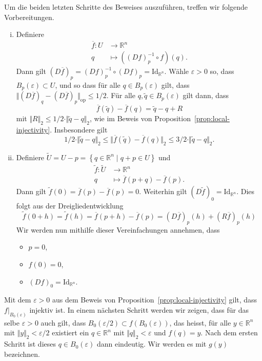 \documentclass[../main.tex]{subfiles}
\begin{document}
Um die beiden letzten Schritte des Beweises auszuführen,
treffen wir folgende Vorbereitungen.
\begin{enumerate}[(i)]
  \item Definiere
    \begin{align*}
      \overline f \colon U & \to \mathbb{R}^n \\
      q & \mapsto ({(Df)}_p^{-1} \circ f)(q).
    \end{align*}
    Dann gilt ${(D \overline f)}_p = {(Df)}_p^{-1} \circ {(Df)}_p 
    = \text{Id}_{\mathbb{R}^n}$.
    Wähle $\varepsilon > 0$ so, dass $B_p(\varepsilon) \subset U$,
    und so dass für alle $q \in B_p(\varepsilon)$ gilt, dass
    \(
      \Vert {(D \overline f)}_q - {(D \overline f)}_p \Vert_{\text{op}}
        \leq 1/2
    \).
    Für alle $q, \widetilde q \in B_p(\varepsilon)$ gilt dann, dass
    \[
      \overline f ( \widetilde q ) - \overline f (q) = \widetilde q - q + R
    \]
    mit $\Vert R \Vert_2 \leq 1/2 \cdot \Vert \widetilde q - q \Vert_2$,
    wie im Beweis von Proposition~\ref{prop:local-injectivity}.
    Insbesondere gilt
    \[
      1/2 \cdot \Vert \widetilde q - q \Vert_2 \leq
      \Vert \overline f ( \widetilde q ) - \overline f (q) \Vert_2
      \leq 3/2 \cdot \Vert \widetilde q - q \Vert_2.
    \]
  \item Definiere $\widetilde U = U - p
    = \left\{q \in \mathbb{R}^n \mid q + p \in U\right\}$
    und 
    \begin{align*}
      \widetilde f \colon \widetilde U & \to \mathbb{R}^n \\
      q & \mapsto \overline f(p + q) - \overline f(p).
    \end{align*}
    Dann gilt $\widetilde f ( 0 ) = \overline f(p) - \overline f (p) = 0$.
    Weiterhin gilt ${(D\widetilde f )}_0 = \text{Id}_{\mathbb{R}^n}$.
    Dies folgt aus der Dreigliedentwicklung
    \[
      \widetilde f ( 0 + h ) = \widetilde f (h)
      = \overline f ( p + h ) - \overline f ( p )
      = {(D \overline f )}_p(h) + {(R \overline f)}_p (h)
    \]
    Wir werden nun mithilfe dieser Vereinfachungen annehmen,
    dass
    \begin{itemize}
      \item $p = 0$,
      \item $f(0) = 0$,
      \item ${(Df)}_0 = \text{Id}_{\mathbb{R}^n}$.
    \end{itemize}
\end{enumerate}

Mit dem $\varepsilon > 0$ aus dem Beweis von
Proposition~\ref{prop:local-injectivity} gilt,
dass
$f |_{B_0(\varepsilon)}$ injektiv ist.
In einem nächsten Schritt werden wir zeigen,
dass für das selbe $\varepsilon > 0$ auch gilt,
dass $B_0(\varepsilon/2) \subset f(B_0(\varepsilon))$,
das heisst, für alle $y \in \mathbb{R}^n$ 
mit $\Vert y \Vert_2 < \varepsilon/2$ existiert
ein $q \in \mathbb{R}^n$ mit $\Vert q \Vert_2 < \varepsilon$ 
und $f(q) = y$.
Nach dem ersten Schritt ist dieses $q \in B_0(\varepsilon)$ 
dann eindeutig. Wir werden es mit $g(y)$ bezeichnen.
\end{document}
